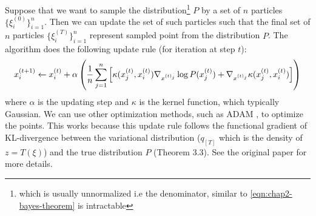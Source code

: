 Suppose that we want to sample the distribution\footnote{which is usually unnormalized i.e the denominator, similar to \ref{eqn:chap2-bayes-theorem} is intractable} $P$ by a set of $n$ particles $\{\xi^{(0)}_i\}^n_{i=1}$. Then we can update the set of such particles such that the final set of $n$ particles $\{\xi^{(T)}_i\}^n_{i=1}$ represent sampled point from the distribution $P$. The algorithm does the following update rule (for iteration at step $t$): 
\begin{equation}
    x^{(t+1)}_i \leftarrow x^{(t)}_i + \alpha \left( \frac{1}{n}\sum^n_{j=1} \left[ \kappa(x^{(t)}_j, x^{(t)}_i) \nabla_{x^{(t)_j}} \log P(x^{(t)}_j) + \nabla_{x^{(t)_j}} \kappa (x^{(t)}_j, x^{(t)}_i)  \right] \right)
\end{equation}
where $\alpha$ is the updating step and $\kappa$ is the kernel function, which typically Gaussian. We can use other optimization methods, such as ADAM \cite{kingma2014adam}, to optimize the points. This works because this update rule follows the functional gradient of KL-divergence between the variational distribution ($q_{[T]}$ which is the density of $z = T(\xi)$) and the true distribution $P$ (Theorem 3.3). See the original paper for more details.


